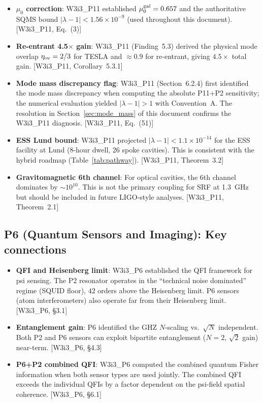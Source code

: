 \documentclass[11pt,twocolumn]{article}
\newcommand{\lam}{\lambda}
\newcommand{\ee}[1]{\times 10^{#1}}
\theoremstyle{definition}
\theoremstyle{remark}
\begin{document}
\begin{itemize}[nosep]
\item \textbf{$\mu_0$ correction}: W3i3\_P11 established $\mu_0^{\rm gal} = 0.657$
and the authoritative SQMS bound $|\lam-1| < 1.56\ee{-9}$ (used throughout
this document). [W3i3\_P11, Eq.~(3)]
\item \textbf{Re-entrant 4.5$\times$ gain}: W3i3\_P11 (Finding~5.3) derived
the physical mode overlap $\eta_{\rm ov} = 2/3$ for TESLA and $\approx0.9$
for re-entrant, giving $4.5\times$ total gain. [W3i3\_P11, Corollary~5.3.1]
\item \textbf{Mode mass discrepancy flag}: W3i3\_P11 (Section~6.2.4)
first identified the mode mass discrepancy when computing the
absolute P11+P2 sensitivity; the numerical evaluation yielded
$|\lam-1| > 1$ with Convention~A. The resolution in
Section~\ref{sec:mode_mass} of this document confirms the W3i3\_P11
diagnosis. [W3i3\_P11, Eq.~(51)]
\item \textbf{ESS Lund bound}: W3i3\_P11 projected $|\lam-1| < 1.1\ee{-14}$
for the ESS facility at Lund (8-hour dwell, 26 spoke cavities).
This is consistent with the hybrid roadmap (Table~\ref{tab:pathway}).
[W3i3\_P11, Theorem~3.2]
\item \textbf{Gravitomagnetic 6th channel}: For optical cavities,
the 6th channel dominates by $\sim10^{10}$. This is not the primary
coupling for SRF at 1.3~GHz but should be included in future
LIGO-style analyses. [W3i3\_P11, Theorem~2.1]
\end{itemize}

\subsection{P6 (Quantum Sensors and Imaging): Key connections}
\label{sec:p6_xref}

\begin{itemize}[nosep]
\item \textbf{QFI and Heisenberg limit}: W3i3\_P6 established the
QFI framework for psi sensing. The P2 resonator operates in the
``technical noise dominated'' regime (SQUID floor), $42$ orders
above the Heisenberg limit. P6 sensors (atom interferometers)
also operate far from their Heisenberg limit. [W3i3\_P6, \S3.1]
\item \textbf{Entanglement gain}: P6 identified the GHZ $N$-scaling vs.\
$\sqrt{N}$ independent. Both P2 and P6 sensors can exploit bipartite
entanglement ($N=2$, $\sqrt{2}$ gain) near-term. [W3i3\_P6, \S4.3]
\item \textbf{P6+P2 combined QFI}: W3i3\_P6 computed the combined
quantum Fisher information when both sensor types are used jointly.
The combined QFI exceeds the individual QFIs by a factor dependent
on the psi-field spatial coherence. [W3i3\_P6, \S6.1]
\end{itemize}
\end{document}

